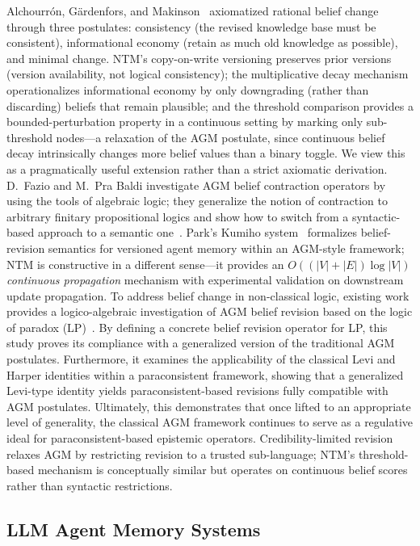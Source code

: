 \documentclass{article}
\theoremstyle{definition}
\begin{document}
Alchourr\'{o}n, G\"{a}rdenfors, and Makinson~\cite{agm1985} axiomatized
rational belief change through three postulates: consistency (the
revised knowledge base must be consistent), informational economy
(retain as much old knowledge as possible), and minimal change. NTM's
copy-on-write versioning preserves prior versions (version availability,
not logical consistency); the multiplicative
decay mechanism operationalizes informational economy by only
downgrading (rather than discarding) beliefs that remain plausible; and
the threshold comparison provides a bounded-perturbation property in a
continuous setting by marking only sub-threshold nodes---a relaxation of
the AGM postulate, since continuous belief decay intrinsically changes
more belief values than a binary toggle. We view this as a pragmatically
useful extension rather than a strict axiomatic derivation.
D.~Fazio and M.~Pra Baldi investigate AGM belief contraction operators by
using the tools of algebraic logic; they generalize the notion of
contraction to arbitrary finitary propositional logics and show how to
switch from a syntactic-based approach to a semantic
one~\cite{fazio2021logicalgebraic}.
Park's Kumiho system~\cite{kumiho2026} formalizes belief-revision
semantics for versioned agent memory within an AGM-style framework; NTM
is constructive
in a different sense---it provides an $O((|V|+|E|)\log|V|)$
\emph{continuous propagation} mechanism with experimental validation on
downstream update propagation.
To address belief change in non-classical logic, existing work provides
a logico-algebraic investigation of AGM belief revision based on the
logic of paradox (LP)~\cite{massimiliano2022paraconsistent}. By defining
a concrete belief revision operator for LP, this study proves its
compliance with a generalized version of the traditional AGM postulates.
Furthermore, it examines the applicability of the classical Levi and
Harper identities within a paraconsistent framework, showing that a
generalized Levi-type identity yields paraconsistent-based revisions
fully compatible with AGM postulates. Ultimately, this demonstrates that
once lifted to an appropriate level of generality, the classical AGM
framework continues to serve as a regulative ideal for
paraconsistent-based epistemic operators.
Credibility-limited revision~\cite{hansson1999revision} relaxes AGM by
restricting revision to a trusted sub-language; NTM's threshold-based
mechanism is conceptually similar but operates on continuous belief
scores rather than syntactic restrictions.

\subsection{LLM Agent Memory Systems}
\label{sec:related-memory}
\end{document}
